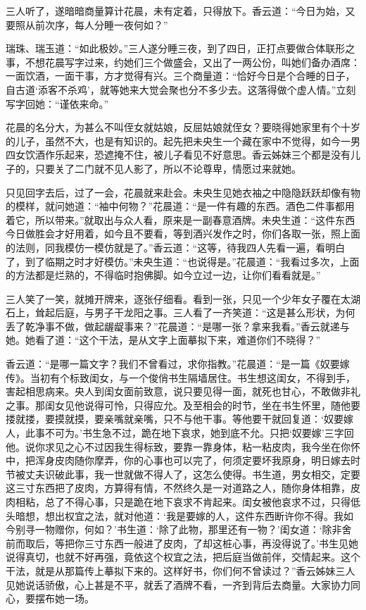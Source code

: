 \documentclass[a4paper,12pt,UTF8,twoside]{ctexbook}
\begin{document}
三人听了，遂暗暗商量算计花晨，未有定着，只得放下。香云道：“今日为始，又要照从前次序，每人分睡一夜何如？”

瑞珠、瑞玉道：“如此极妙。”三人遂分睡三夜，到了四日，正打点要做合体联形之事，不想花晨写字过来，约她们三个做盛会，又出了一两公份，叫她们备办酒席：一面饮酒，一面干事，方才觉得有兴。三个商量道：“恰好今日是个合睡的日子，自古道‘添客不杀鸡’，就等她来大觉会聚也分不多少去。这落得做个虚人情。”立刻写字回她：“谨依来命。”

花晨的名分大，为甚么不叫侄女就姑娘，反屈姑娘就侄女？要晓得她家里有个十岁的儿子，虽然不大，也是有知识的。起先把未央生一个藏在家中不觉得，如今一男四女饮酒作乐起来，恐遮掩不住，被儿子看见不好意思。香云姊妹三个都是没有儿子的，只要关了二门就不见人影了，所以不论尊卑，情愿过来就她。

只见回字去后，过了一会，花晨就来赴会。未央生见她衣袖之中隐隐跃跃却像有物的模样，就问她道：“袖中何物？”花晨道：“是一件有趣的东西。酒色二件事都用着它，所以带来。”就取出与众人看，原来是一副春意酒牌。未央生道：“这件东西今日做胜会才好用着，如今且不要看，等到酒兴发作之时，你们各取一张，照上面的法则，同我模仿一模仿就是了。”香云道：“这等，待我四人先看一遍，看明白了，到了临期之时才好模仿。”未央生道：“也说得是。”花晨道：“我看过多次，上面的方法都是烂熟的，不得临时抱佛脚。如今立过一边，让你们看看就是。”

三人笑了一笑，就摊开牌来，逐张仔细看。看到一张，只见一个少年女子覆在太湖石上，耸起后庭，与男子干龙阳之事。三人看了一齐笑道：“这是甚么形状，为何丢了乾净事不做，做起龌龊事来？”花晨道：“是哪一张？拿来我看。”香云就递与她。她看了道：“这个干法，是从文字上面摹拟下来，难道你们不晓得？”

香云道：“是哪一篇文字？我们不曾看过，求你指教。”花晨道：“是一篇《奴要嫁传》。当初有个标致闺女，与一个俊俏书生隔墙居住。书生想这闺女，不得到手，害起相思病来。央人到闺女面前致意，说只要见得一面，就死也甘心，不敢做非礼之事。那闺女见他说得可怜，只得应允。及至相会的时节，坐在书生怀里，随他要搂就搂，要摸就摸，要亲嘴就亲嘴，只不与他干事。等他要干就回复道：‘奴要嫁人，此事不可为。’书生急不过，跪在地下哀求，她到底不允。只把‘奴要嫁’三字回他。说你求见之心不过因我生得标致，要靠一靠身体，粘一粘皮肉，我今坐在你怀中，把浑身皮肉随你摩弄，你的心事也可以完了，何须定要坏我原身，明日嫁去时节被丈夫识破此事，我一世就做不得人了，这怎么使得。书生道，男女相交，定要这三寸东西把了皮肉，方算得有情，不然终久是一对道路之人，随你身体相靠，皮肉相粘，总了不得心事，只是跪在地下哀求不肯起来。闺女被他哀求不过，只得低头暗想，想出权宜之法，就对他道：‘我是要嫁的人，这件东西断许你不得。我如今别寻一物赠你，何如？’书生道：‘除了此物，那里还有一物？’闺女道：‘除非舍前而取后，等把你三寸东西一般进了皮肉，了却这桩心事，再没得说了。’书生见她说得真切，也就不好再强，竟依这个权宜之法，把后庭当做前伴，交情起来。这个干法，就是从那篇传上摹拟下来的。这样好书，你们何不曾读过？”香云姊妹三人见她说话骄傲，心上甚是不平，就丢了酒牌不看，一齐到背后去商量。大家协力同心，要摆布她一场。
\end{document}
